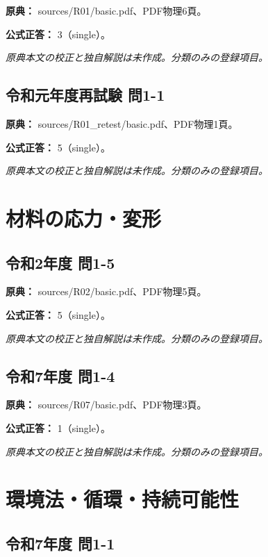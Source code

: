\noindent\textbf{原典：} sources/R01/basic.pdf、PDF物理6頁。

\textbf{公式正答：} 3（single）。

\par\textit{原典本文の校正と独自解説は未作成。分類のみの登録項目。}

\subsection{令和元年度再試験 問1-1}
\label{q:r01-ret-basic-1-1}

\noindent\textbf{原典：} sources/R01\_retest/basic.pdf、PDF物理1頁。

\textbf{公式正答：} 5（single）。

\par\textit{原典本文の校正と独自解説は未作成。分類のみの登録項目。}

\section{材料の応力・変形}

\subsection{令和2年度 問1-5}
\label{q:r02-reg-basic-1-5}

\noindent\textbf{原典：} sources/R02/basic.pdf、PDF物理5頁。

\textbf{公式正答：} 5（single）。

\par\textit{原典本文の校正と独自解説は未作成。分類のみの登録項目。}

\subsection{令和7年度 問1-4}
\label{q:r07-reg-basic-1-4}

\noindent\textbf{原典：} sources/R07/basic.pdf、PDF物理3頁。

\textbf{公式正答：} 1（single）。

\par\textit{原典本文の校正と独自解説は未作成。分類のみの登録項目。}

\section{環境法・循環・持続可能性}

\subsection{令和7年度 問1-1}
\label{q:r07-reg-basic-1-1}

